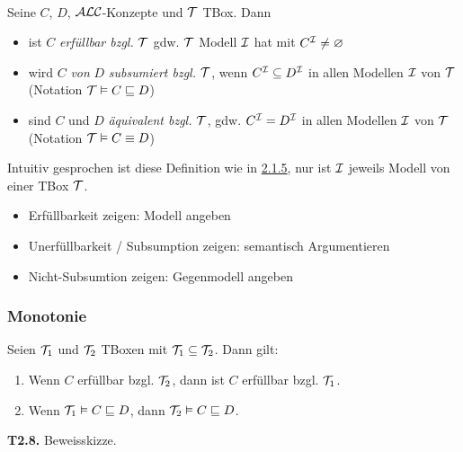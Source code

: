 \begin{definition} \\
Seine $C$, $D$, $\mathcal{A}\mathcal{L}\mathcal{C}$-Konzepte und $\mathcal{T}$ TBox. Dann

\begin{itemize}
  \item ist $C$ \emph{erfüllbar bzgl.} $\mathcal{T}$ gdw. $\mathcal{T}$ Modell $\mathcal{I}$ hat mit $C^{\mathcal{I}} \neq \varnothing$
  \item wird $C$ \emph{von} $D$ \emph{subsumiert bzgl.} $\mathcal{T}$, wenn $C^{\mathcal{I}} \subseteq D^{\mathcal{I}}$ in allen Modellen $\mathcal{I}$ von $\mathcal{T}$ (Notation $\mathcal{T} \vDash C \sqsubseteq D$)
  \item sind $C$ und $D$ \emph{äquivalent bzgl.} $\mathcal{T}$, gdw. $C^{\mathcal{I}} = D^{\mathcal{I}}$ in allen Modellen $\mathcal{I}$ von $\mathcal{T}$ (Notation $\mathcal{T} \vDash C \equiv D$)
\end{itemize}
\end{definition}

Intuitiv gesprochen ist diese Definition wie in \protect\hyperlink{erfuxfcllbarkeit-subsumtion-uxe4quivalenz}{2.1.5}, nur ist $\mathcal{I}$ jeweils Modell von einer TBox $\mathcal{T}$.

\begin{itemize}
\item
  Erfüllbarkeit zeigen: Modell angeben
\item
  Unerfüllbarkeit / Subsumption zeigen: semantisch Argumentieren
\item
  Nicht-Subsumtion zeigen: Gegenmodell angeben
\end{itemize}

\subsubsection{Monotonie}\label{monotonie}

\begin{lemma}
Seien $\mathcal{T}_{1}$ und $\mathcal{T}_{2}$ TBoxen mit $\mathcal{T}_{1} \subseteq \mathcal{T}_{2}$. Dann gilt:
\end{lemma}

\begin{enumerate}
\def\labelenumi{\arabic{enumi}.}
\item
  Wenn $C$ erfüllbar bzgl. $\mathcal{T}_{2}$, dann ist $C$ erfüllbar bzgl.
  $\mathcal{T}_{1}$.
\item
  Wenn $\mathcal{T}_{1} \vDash C \sqsubseteq D$, dann
  $\mathcal{T}_{2} \vDash C \sqsubseteq D$.
\end{enumerate}

\textbf{T2.8.} Beweisskizze.

